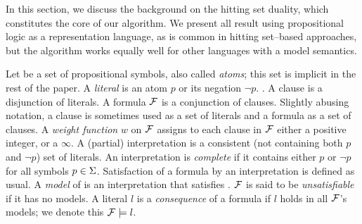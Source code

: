 
In this section, we discuss the background on the hitting set duality, which constitutes the core of our algorithm. 
We present all result using propositional logic  as a representation language, as is common in hitting set--based approaches, but the algorithm works equally well for other languages with a model semantics. 
 
%  
% 
% 

\newcommand\F{\formula}
Let \voc be a set of propositional symbols, also called \emph{atoms}; this set is implicit in the rest of the paper. A \emph{literal} is an atom $p$ or its negation $\lnot p$.  . A clause is a disjunction of literals. A formula $\mathcal{F} $ is a conjunction of clauses. 
Slightly abusing notation, a clause is sometimes used as a set of literals and a formula as a set of clauses.
A \emph{weight function} $w$ on $\mathcal{F} $ assigns to each clause in $\mathcal{F} $ either a positive integer, or a $\infty$. 
A (partial) interpretation is a consistent (not containing both $p$ and $\lnot p$) set of literals. An interpretation is \emph{complete} if it contains either $p$ or $\lnot p$ for all symbols $p\in \Sigma$. 
Satisfaction of a formula \formula by an interpretation is defined as usual. 
A \emph{model} of \formula is an interpretation that satisfies \formula. 
$\mathcal{F} $ is said to be \emph{unsatisfiable} if it has no models.
A literal $l$ is a \emph{consequence} of a formula \formula if $l$ holds in all $\mathcal{F} $'s models; we denote this $\mathcal{F} \models l$. 

